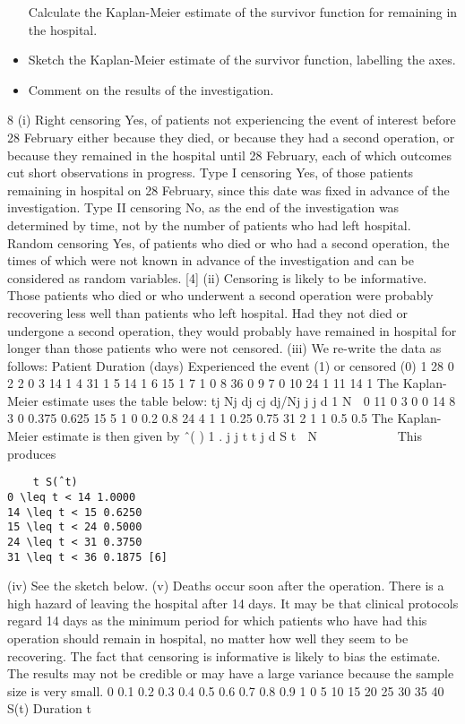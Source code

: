 \documentclass[a4paper,12pt]{article}
\begin{document}
\begin{itemize}
\ite[(iii)] Calculate the Kaplan-Meier estimate of the survivor function for remaining in
the hospital.
\item[(iv)] Sketch the Kaplan-Meier estimate of the survivor function, labelling the axes.

\item[(v)] Comment on the results of the investigation. 
\end{itemize}

\newpage
  8 (i) Right censoring
Yes, of patients not experiencing the event of interest before 28 February
either because they died, or because they had a second operation, or because
they remained in the hospital until 28 February, each of which outcomes cut
short observations in progress.
Type I censoring
Yes, of those patients remaining in hospital on 28 February, since this date
was fixed in advance of the investigation.
Type II censoring
No, as the end of the investigation was determined by time, not by the number
of patients who had left hospital.
Random censoring
Yes, of patients who died or who had a second operation, the times of which
were not known in advance of the investigation and can be considered as
random variables. [4]
(ii) Censoring is likely to be informative.
Those patients who died or who underwent a second operation were
probably recovering less well than patients who left hospital.
Had they not died or undergone a second operation, they would probably
have remained in hospital for longer than those patients who were not
censored. 
(iii) We re-write the data as follows:
  Patient Duration (days) Experienced the event (1)
or censored (0)
1 28 0
2 2 0
3 14 1
4 31 1
5 14 1
6 15 1
7 1 0
8 36 0
9 7 0
10 24 1
11 14 1
The Kaplan-Meier estimate uses the table below:
  tj Nj dj cj dj/Nj j
j
d
1
N

0 11 0 3 0 0
14 8 3 0 0.375 0.625
15 5 1 0 0.2 0.8
24 4 1 1 0.25 0.75
31 2 1 1 0.5 0.5
The Kaplan-Meier estimate is then given by
ˆ( ) 1 . j
j
t t
j
d
S t
 N
 
    
 
This produces
\begin{verbatim}
    t S(ˆt)
0 \leq t < 14 1.0000
14 \leq t < 15 0.6250
15 \leq t < 24 0.5000
24 \leq t < 31 0.3750
31 \leq t < 36 0.1875 [6]
\end{verbatim}

(iv) See the sketch below.
\newpage
(v) Deaths occur soon after the operation.
There is a high hazard of leaving the hospital after 14 days.
It may be that clinical protocols regard 14 days as the minimum period for
which patients who have had this operation should remain in hospital, no
matter how well they seem to be recovering.
The fact that censoring is informative is likely to bias the estimate.
The results may not be credible or may have a large variance because the
sample size is very small.
0
0.1
0.2
0.3
0.4
0.5
0.6
0.7
0.8
0.9
1
0 5 10 15 20 25 30 35 40
S(t)
Duration t
\end{document}
